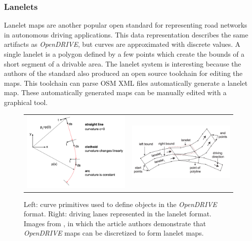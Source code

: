 \documentclass[12pt,twoside]{article}
\begin{document}
\subsubsection{Lanelets}
Lanelet maps \cite{Lanelet1} are another popular open standard for representing road networks in autonomous driving applications. This data representation describes the same artifacts as \textit{OpenDRIVE}, but curves are approximated with discrete values. A single lanelet is a polygon defined by a few points which create the bounds of a short segment of a drivable area. The lanelet system is interesting because the authors of the standard also produced an open source toolchain \cite{Lanelet2} for editing the maps. This toolchain can parse OSM XML files automatically generate a lanelet map. These automatically generated maps can be manually edited with a graphical tool.

\begin{figure}
\centering
\begin{tabular}{cc}
  \includegraphics[width=85mm]{opendrive.png} & \includegraphics[width=85mm]{lanelet.png}
\end{tabular}
\caption{Left: curve primitives used to define objects in the \textit{OpenDRIVE} format. Right: driving lanes represented in the lanelet format. Images from \cite{Lanelet3}, in which the article authors demonstrate that \textit{OpenDRIVE} maps can be discretized to form lanelet maps.}
\label{fig:lanelet}
\end{figure}
\end{document}
